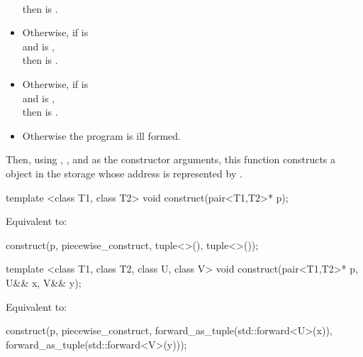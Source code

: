 \begin{itemdescr}
\begin{itemize}
\\
then  is .
\item
Otherwise, if  is 
\\
and
 is ,
\\
then  is .
\item
Otherwise, if  is 
\\
and
 is ,
\\
then
 is .
\item
Otherwise the program is ill formed.
\end{itemize}

Then, using , , and 
as the constructor arguments,
this function constructs a  object
in the storage whose address is represented by .
\end{itemdescr}

%
\begin{itemdecl}
template <class T1, class T2>
  void construct(pair<T1,T2>* p);
\end{itemdecl}

\begin{itemdescr}
\pnum
\effects
Equivalent to:
\begin{codeblock}
construct(p, piecewise_construct, tuple<>(), tuple<>());
\end{codeblock}
\end{itemdescr}

%
\begin{itemdecl}
template <class T1, class T2, class U, class V>
  void construct(pair<T1,T2>* p, U&& x, V&& y);
\end{itemdecl}

\begin{itemdescr}
\pnum
\effects
Equivalent to:
\begin{codeblock}
construct(p, piecewise_construct,
          forward_as_tuple(std::forward<U>(x)),
          forward_as_tuple(std::forward<V>(y)));
\end{codeblock}
\end{itemdescr}

